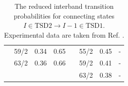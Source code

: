 \begin{table}
\begin{tabular}{|cccc|clc|cc|}
    \multicolumn{1}{|c|}{} & \multicolumn{1}{c|}{59/2} & \multicolumn{1}{c|}{0.34} & 0.65 & \multicolumn{2}{c|}{} & 55/2 & \multicolumn{1}{c|}{0.45} & - \\ \cline{2-4} \cline{7-9} 
    \multicolumn{1}{|c|}{} & \multicolumn{1}{c|}{63/2} & \multicolumn{1}{c|}{0.36} & 0.66 & \multicolumn{2}{c|}{} & 59/2 & \multicolumn{1}{c|}{0.41} & - \\ \cline{1-4} \cline{7-9} 
    \multicolumn{4}{|c|}{} & \multicolumn{2}{c|}{} & 63/2 & \multicolumn{1}{c|}{0.38} & - \\ \hline
    \end{tabular}
    \caption{The reduced interband transition probabilities for connecting states $I\in\text{TSD2}\to I-1\in\text{TSD1}$. Experimental data are taken from Ref. \cite{reich2010nuclear}.}
    \label{table-interband-E2-numerical-results}
\end{table}

